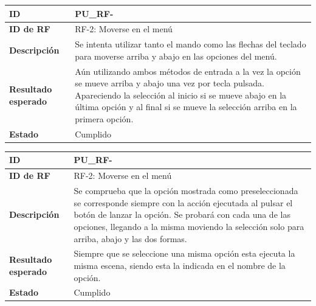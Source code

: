 \begin{center}
	\begin{tabular}{ | p{3cm} | p{10cm} | } 
		\hline
		
		\textbf{ID} & PU\_RF-\arabic{contador_pruebas_funcionales}
		{contador_pruebas_funcionales} \\
		
		\hline 
		\textbf{ID de RF} &
		RF-2: Moverse en el menú\\ 
		
		\hline
		\textbf{Descripción} & 
		Se intenta utilizar tanto el mando como las flechas del teclado para moverse arriba y abajo en las opciones del menú.\\
		
		\hline 
		\textbf{Resultado esperado} &
		Aún utilizando ambos métodos de entrada a la vez la opción se mueve arriba y abajo una vez por tecla pulsada. Apareciendo la selección al inicio si se mueve abajo en la última opción y al final si se mueve la selección arriba en la primera opción.\\ 
		
		\hline 
		\textbf{Estado} &
		Cumplido\\ 
		
		\hline
	\end{tabular}
\end{center}

\begin{center}
	\begin{tabular}{ | p{3cm} | p{10cm} | } 
		\hline
		
		\textbf{ID} & PU\_RF-\arabic{contador_pruebas_funcionales}
		{contador_pruebas_funcionales} \\
		
		\hline 
		\textbf{ID de RF} &
		RF-2: Moverse en el menú\\ 
		
		\hline
		\textbf{Descripción} & 
		Se comprueba que la opción mostrada como preseleccionada se corresponde siempre con la acción ejecutada al pulsar el botón de lanzar la opción. Se probará con cada una de las opciones, llegando a la misma moviendo la selección solo para arriba, abajo y las dos formas.\\
		
		\hline 
		\textbf{Resultado esperado} &
		Siempre que se seleccione una misma opción esta ejecuta la misma escena, siendo esta la indicada en el nombre de la opción.\\ 
		
		\hline 
		\textbf{Estado} &
		Cumplido\\ 
		
		\hline
	\end{tabular}
\end{center}


